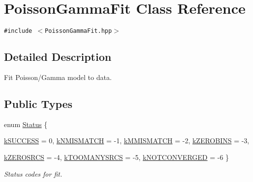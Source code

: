 \hypertarget{classPoissonGammaFit}{
\section{Poisson\-Gamma\-Fit Class Reference}
\label{classPoissonGammaFit}
}
{\tt \#include $<$Poisson\-Gamma\-Fit.hpp$>$}



\subsection{Detailed Description}
Fit Poisson/Gamma model to data. 

\subsection*{Public Types}
\begin{CompactItemize}
\item 
enum \hyperlink{classPoissonGammaFit_w7}{Status} \{ \par
\hyperlink{classPoissonGammaFit_w7w0}{k\-SUCCESS} =  0, 
\hyperlink{classPoissonGammaFit_w7w1}{k\-NMISMATCH} = -1, 
\hyperlink{classPoissonGammaFit_w7w2}{k\-MMISMATCH} = -2, 
\hyperlink{classPoissonGammaFit_w7w3}{k\-ZEROBINS} = -3, 
\par
\hyperlink{classPoissonGammaFit_w7w4}{k\-ZEROSRCS} = -4, 
\hyperlink{classPoissonGammaFit_w7w5}{k\-TOOMANYSRCS} = -5, 
\hyperlink{classPoissonGammaFit_w7w6}{k\-NOTCONVERGED} = -6
 \}
\begin{CompactList}\small\item\em Status codes for fit. \item\end{CompactList}\end{CompactItemize}
